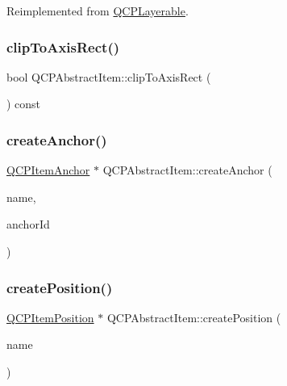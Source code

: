 Reimplemented from \hyperlink{class_q_c_p_layerable_acbcfc9ecc75433747b1978a77b1864b3}{Q\+C\+P\+Layerable}.

\mbox{\label{class_q_c_p_abstract_item_a42715ad5f3d7fca6854025fa5636f436}} 
\subsubsection{\texorpdfstring{clip\+To\+Axis\+Rect()}{clipToAxisRect()}}
{\footnotesize\ttfamily bool Q\+C\+P\+Abstract\+Item\+::clip\+To\+Axis\+Rect (\begin{DoxyParamCaption}{ }\end{DoxyParamCaption}) const\hspace{0.3cm}{\ttfamily [inline]}}

\mbox{\label{class_q_c_p_abstract_item_af3fc92527802078ca395138748b629a7}} 
\subsubsection{\texorpdfstring{create\+Anchor()}{createAnchor()}}
{\footnotesize\ttfamily \hyperlink{class_q_c_p_item_anchor}{Q\+C\+P\+Item\+Anchor} $\ast$ Q\+C\+P\+Abstract\+Item\+::create\+Anchor (\begin{DoxyParamCaption}\item[{const Q\+String \&}]{name,  }\item[{int}]{anchor\+Id }\end{DoxyParamCaption})\hspace{0.3cm}{\ttfamily [protected]}}

\mbox{\label{class_q_c_p_abstract_item_a75036d39c4d4e2e1a7dd145fff915d32}} 
\subsubsection{\texorpdfstring{create\+Position()}{createPosition()}}
{\footnotesize\ttfamily \hyperlink{class_q_c_p_item_position}{Q\+C\+P\+Item\+Position} $\ast$ Q\+C\+P\+Abstract\+Item\+::create\+Position (\begin{DoxyParamCaption}\item[{const Q\+String \&}]{name }\end{DoxyParamCaption})\hspace{0.3cm}{\ttfamily [protected]}}

